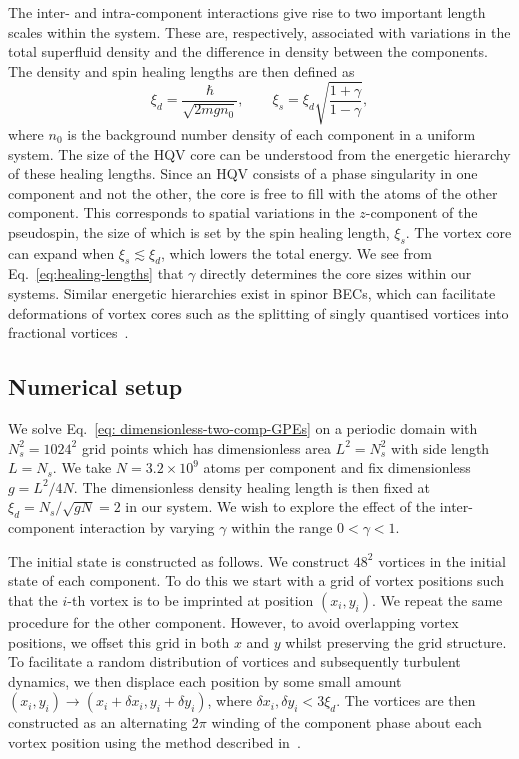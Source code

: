 The inter- and intra-component interactions give rise to two important length
scales within the system.
These are, respectively, associated with variations in the total superfluid
density and the difference in density between the components.
The density and spin healing lengths are then defined as~\cite{Eto2011}
\begin{equation}
    \xi_d = \frac{\hbar}{\sqrt{2mgn_0}}, \qquad
    \xi_s = \xi_d \sqrt{\frac{1 + \gamma}{1 - \gamma}},
    \label{eq:healing-lengths}
\end{equation}
where \(n_0\) is the background number density of each component in a uniform
system.
The size of the HQV core can be understood from the energetic hierarchy of
these healing lengths.
Since an HQV consists of a phase singularity in one component and not the other,
the core is free to fill with the atoms of the other component.
This corresponds to spatial variations in the \( z \)-component of the
pseudospin, the size of which is set by the spin healing length, \(\xi_s\).
The vortex core can expand when \(\xi_s \lesssim \xi_d\), which lowers
the total energy.
We see from Eq.~\eqref{eq:healing-lengths} that \(\gamma \) directly determines
the core sizes within our systems.
Similar energetic hierarchies exist in spinor BECs, which can facilitate
deformations of vortex cores such as the splitting of singly quantised vortices
into fractional vortices~\cite{Seo2015}.

\subsection{Numerical setup}\label{sec:numerical-setup}
We solve Eq.~\eqref{eq: dimensionless-two-comp-GPEs} on a periodic domain with
\(N_s^2=1024^2\) grid points which has dimensionless area \(L^2=N_s^2\) with
side length \(L=N_s\).
We take \(N=3.2\times10^9\) atoms per component and fix dimensionless
\(g=L^2/4N\).
The dimensionless density healing length is then fixed at
\(\xi_d=N_s/\sqrt{gN}=2\) in our system.
We wish to explore the effect of the inter-component interaction by varying
\(\gamma \) within the range \(0 < \gamma < 1\).

The initial state is constructed as follows.
We construct \(48^2\) vortices in the initial state of each component.
To do this we start with a grid of vortex positions such that the
\(i\)-th vortex is to be imprinted at position \((x_i, y_i)\).
We repeat the same procedure for the other component.
However, to avoid overlapping vortex positions, we offset this grid in both
\(x\) and \(y\) whilst preserving the grid structure.
To facilitate a random distribution of vortices and subsequently turbulent
dynamics, we then displace each position by some small amount
\((x_i, y_i) \rightarrow (x_i + \delta x_i, y_i + \delta y_i)\), where
\(\delta x_i, \delta y_i < 3\xi_d\).
The vortices are then constructed as an alternating \( 2\pi \) winding of the
component phase about each vortex position using the method described
in~\cite{Billam2014}.

